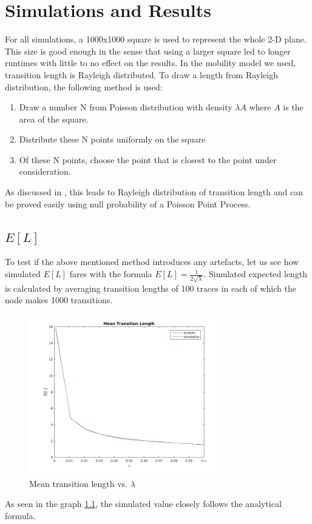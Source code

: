 \chapter{Simulations and Results}
For all simulations, a 1000x1000 square is used to represent the whole 2-D plane. This size is good enough in the sense that using a larger square led to longer runtimes with little to no 
effect on the results. In the mobility model we used, transition length is Rayleigh distributed. To draw a length from Rayleigh distribution, the following method is used:

\begin{enumerate}
	\item Draw a number N from Poisson distribution with density $\lambda A$ where $A$ is the area of the square.
	\item Distribute these N points uniformly on the square 
	\item Of these N points, choose the point that is closest to the point under consideration. 
\end{enumerate}

As discussed in \cite{ganti}, this leads to Rayleigh distribution of transition length and can be proved easily using null probability of a Poisson Point Process. 

\section{$E[L]$}
To test if the above mentioned method introduces any artefacts, let us see how simulated $E[L]$ fares with the formula $E[L] = \frac{1}{2\sqrt{\lambda}}$. Simulated expected length is calculated by averaging transition lengths of 100 traces in each of which the node makes 1000 transitions. 
\begin{figure}[h]
	\centering \vspace{-0.1in}
	\includegraphics[width=0.75\textwidth]{images/rwpStat.png}
	\vspace{-20pt} \caption[Mean transition length vs. $\lambda$]{Mean transition length vs. $\lambda$}
	\label{fig:rwpEL}
\end{figure}
As seen in the graph \ref{fig:rwpEL}, the simulated value closely follows the analytical formula.
